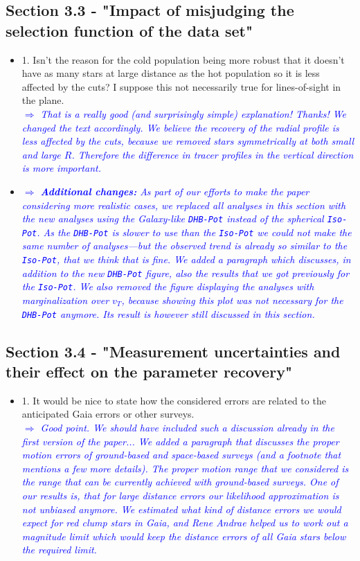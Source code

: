 \documentclass[10pt,a4paper]{article}
\newcommand{\Comment}[1]{\textsl{\textcolor{Blue}{$\Longrightarrow$ {#1}}}}
\begin{document}
\subsection{Section 3.3 - "Impact of misjudging the selection function of the data set"}
\begin{itemize}
\item 1. Isn't the reason for the cold population being more robust that it doesn't have as many stars at large distance as the hot population so it is less affected by the cuts? I suppose this not necessarily true for lines-of-sight in the plane. \\\Comment{That is a really good (and surprisingly simple) explanation! Thanks! We changed the text accordingly. We believe the recovery of the radial profile is less affected by the cuts, because we removed stars symmetrically at both small and large $R$. Therefore the difference in tracer profiles in the vertical direction is more important.}
\item \Comment{\textbf{Additional changes:} As part of our efforts to make the paper considering more realistic cases, we replaced all analyses in this section with the new analyses using the Galaxy-like \texttt{DHB-Pot} instead of the spherical \texttt{Iso-Pot}. As the \texttt{DHB-Pot} is slower to use than the \texttt{Iso-Pot} we could not make the same number of analyses---but the observed trend is already so similar to the \texttt{Iso-Pot}, that we think that is fine. We added a paragraph which discusses, in addition to the new \texttt{DHB-Pot} figure, also the results that we got previously for the \texttt{Iso-Pot}. We also removed the figure displaying the analyses with marginalization over $v_T$, because showing this plot was not necessary for the \texttt{DHB-Pot} anymore. Its result is however still discussed in this section.}
\end{itemize}

\subsection{Section 3.4 - "Measurement uncertainties and their effect on the parameter recovery"}
\begin{itemize}
\item 1. It would be nice to state how the considered errors are related to the anticipated Gaia errors or other surveys. \\\Comment{Good point. We should have included such a discussion already in the first version of the paper... We added a paragraph that discusses the proper motion errors of ground-based and space-based surveys (and a footnote that mentions a few more details). The proper motion range that we considered is the range that can be currently achieved with ground-based surveys. One of our results is, that for large distance errors our likelihood approximation is not unbiased anymore. We estimated what kind of distance errors we would expect for red clump stars in Gaia, and Rene Andrae helped us to work out a magnitude limit which would keep the distance errors of all Gaia stars below the required limit.}
\end{itemize}
\end{document}
